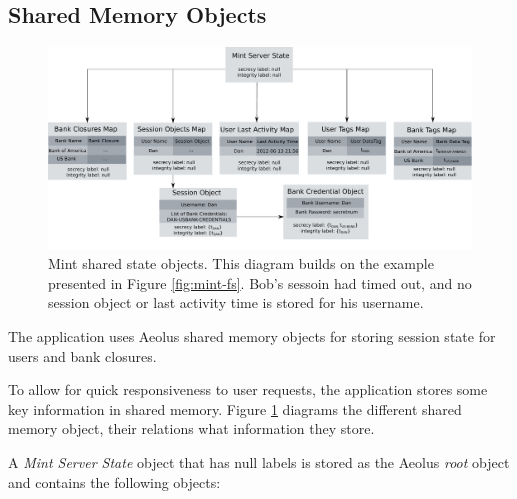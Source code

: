 \subsection{Shared Memory Objects}
\label{sec:mint-smo}

\begin{figure}[h]
\centering
\includegraphics[width=\textwidth,height=\textheight,keepaspectratio]{figures/mint-shared-state}
\caption{Mint shared state objects. This diagram builds on the example presented in Figure \ref{fig:mint-fs}. Bob's sessoin had timed out, and no session object or last activity time is stored for his username.}
\label{fig:mint-ss}
\end{figure}

The application uses Aeolus shared memory objects for storing session state for users and bank closures.

To allow for quick responsiveness to user requests, the application stores some key information in shared memory. Figure \ref{fig:mint-ss} diagrams the different shared memory object, their relations what information they store.

A \emph{Mint Server State} object that has null labels is stored as the Aeolus \emph{root} object and contains the following objects:

